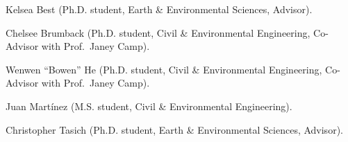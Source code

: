 \item Kelsea Best (Ph.D. student, Earth \& Environmental Sciences, Advisor).
\item Chelsee Brumback (Ph.D. student, Civil \& Environmental Engineering,
Co-Advisor with Prof.\ Janey Camp).
\item Wenwen ``Bowen'' He (Ph.D. student, Civil \& Environmental Engineering, Co-Advisor with Prof.\ Janey Camp).
\item Juan Mart\'inez (M.S. student, Civil \& Environmental Engineering).
\item Christopher Tasich (Ph.D. student, Earth \& Environmental Sciences, Advisor).
